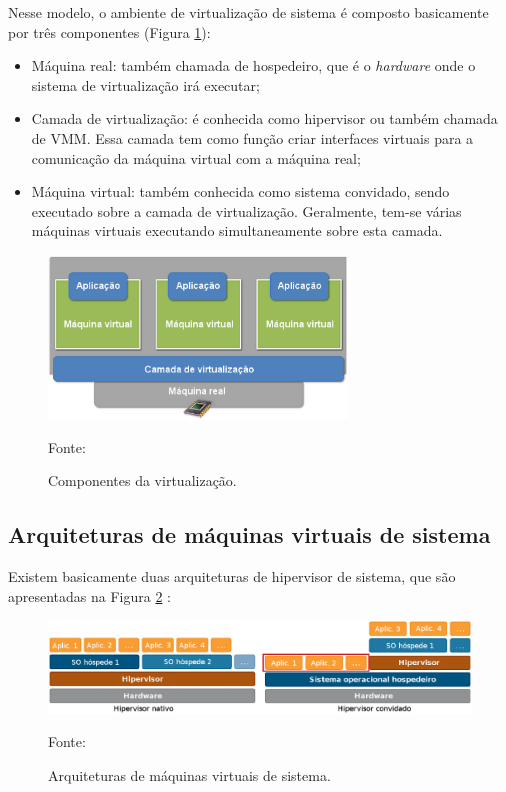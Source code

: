 Nesse modelo, o ambiente de virtualização de sistema é composto basicamente por três componentes (Figura \ref{fig:virtcomponentes}):
\begin{itemize}
 \item Máquina real: também chamada de hospedeiro, que é o \textit{hardware} onde o sistema de virtualização irá executar;
 \item Camada de virtualização: é conhecida como hipervisor ou também chamada de \ac{VMM}. Essa camada tem como função criar interfaces 
 virtuais para a comunicação da máquina virtual com a máquina real;
 \item Máquina virtual: também conhecida como sistema convidado, sendo executado sobre a camada de virtualização. Geralmente, tem-se
 várias máquinas virtuais executando simultaneamente sobre esta camada.
\end{itemize}

\begin{figure}[h!]
 \centering
 \includegraphics[width=300px]{img/virtcomponentes.eps}
 \caption{Componentes da virtualização.}
 \label{fig:virtcomponentes}
 Fonte: \citet{andrade2011}
\end{figure}

\subsection{Arquiteturas de máquinas virtuais de sistema}
\label{section:virtarquit}

Existem basicamente duas arquiteturas de hipervisor de sistema, que são apresentadas na Figura \ref{fig:vms_arquiteturas} \cite{maziero2013}:

\begin{figure}[h!]
 \centering
 \includegraphics[width=450px]{img/vms_arquiteturas.eps}
 \caption{Arquiteturas de máquinas virtuais de sistema.}
 \label{fig:vms_arquiteturas}
 Fonte: \citet{macedo2016}
\end{figure}

